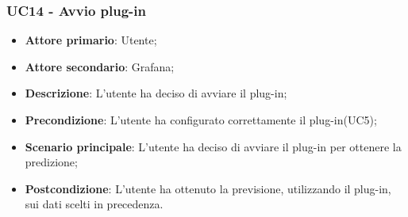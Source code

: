 \subsubsection{UC14 - Avvio plug-in}
\label{sssec:uc14}
\begin{itemize}
  \item \textbf{Attore primario}: Utente;
  \item \textbf{Attore secondario}: Grafana;
  \item \textbf{Descrizione}: L'utente ha deciso di avviare il plug-in;
  \item \textbf{Precondizione}: L'utente ha configurato correttamente il plug-in(UC5);
  \item \textbf{Scenario principale}: L'utente ha deciso di avviare il plug-in per ottenere la predizione;
  \item \textbf{Postcondizione}: L'utente ha ottenuto la previsione, utilizzando il plug-in, sui dati scelti in precedenza.
\end{itemize}
